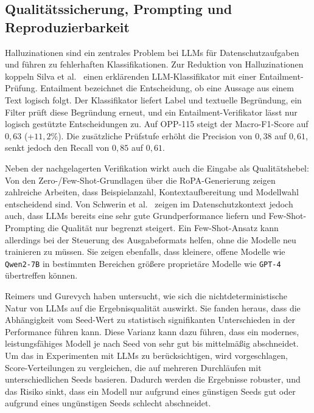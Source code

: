 \subsection*{Qualitätssicherung, Prompting und Reproduzierbarkeit}

Halluzinationen sind ein zentrales Problem bei \acp{LLM} für Datenschutzaufgaben und führen zu fehlerhaften Klassifikationen. Zur Reduktion von Halluzinationen koppeln Silva et al.\ \cite{silva2024entailment} einen erklärenden \ac{LLM}-Klassifikator mit einer Entailment-Prüfung. Entailment bezeichnet die Entscheidung, ob eine Aussage aus einem Text logisch folgt. Der Klassifikator liefert Label und textuelle Begründung, ein Filter prüft diese Begründung erneut, und ein Entailment-Verifikator lässt nur logisch gestützte Entscheidungen zu. Auf OPP-115 steigt der Macro-F1-Score auf $0{,}63$ (+$11{,}2$\%). Die zusätzliche Prüfstufe erhöht die Precision von $0{,}38$ auf $0{,}61$, senkt jedoch den Recall von $0{,}85$ auf $0{,}61$.

Neben der nachgelagerten Verifikation wirkt auch die Eingabe als Qualitätshebel: Von den Zero-/Few-Shot-Grundlagen \cite{brown2020fewshot,liu2023prompting} über die RoPA-Generierung \cite{pragyan2024toward} zeigen zahlreiche Arbeiten, dass Beispielanzahl, Kontextaufbereitung und Modellwahl entscheidend sind. Von Schwerin et al.\ \cite{schwerin2024systematic} zeigen im Datenschutzkontext jedoch auch, dass \acp{LLM} bereits eine sehr gute Grundperformance liefern und Few-Shot-Prompting die Qualität nur begrenzt steigert. Ein Few-Shot-Ansatz kann allerdings bei der Steuerung des Ausgabeformats helfen, ohne die Modelle neu trainieren zu müssen. Sie zeigen ebenfalls, dass kleinere, offene Modelle wie \texttt{Qwen2-7B} in bestimmten Bereichen größere proprietäre Modelle wie \texttt{GPT-4} übertreffen können.

Reimers und Gurevych \cite{reimers2017reporting} haben untersucht, wie sich die nichtdeterministische Natur von \acp{LLM} auf die Ergebnisqualität auswirkt. Sie fanden heraus, dass die Abhängigkeit vom Seed-Wert zu statistisch signifikanten Unterschieden in der Performance führen kann. Diese Varianz kann dazu führen, dass ein modernes, leistungsfähiges Modell je nach Seed von sehr gut bis mittelmäßig abschneidet. Um das in Experimenten mit \acp{LLM} zu berücksichtigen, wird vorgeschlagen, Score-Verteilungen zu vergleichen, die auf mehreren Durchläufen mit unterschiedlichen Seeds basieren. Dadurch werden die Ergebnisse robuster, und das Risiko sinkt, dass ein Modell nur aufgrund eines günstigen Seeds gut oder aufgrund eines ungünstigen Seeds schlecht abschneidet.

